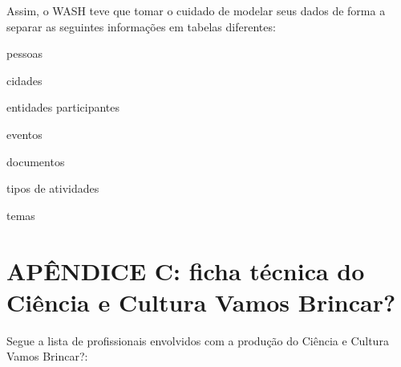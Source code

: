 \documentclass[
12pt,		%
openright,	%
twoside,  %
a4paper,			%
chapter=TITLE,		%
english,			%
french,				%
spanish,			%
brazil				%
]{USPSC-classe/USPSC}
\begin{document}
Assim, o WASH teve que tomar o cuidado de modelar seus dados de forma a separar as seguintes informa\c{c}\~oes em tabelas diferentes:










\begin{alineas}
\item pessoas
\item cidades
\item entidades participantes
\item eventos
\item documentos
\item tipos de atividades
\item temas
\end{alineas}

\chapter[AP\^ENDICE C: ficha t\'ecnica do \textquotedbl Ci\^encia e Cultura Vamos Brincar?\textquotedbl ]{AP\^ENDICE C: ficha t\'ecnica do \textquotedbl Ci\^encia e Cultura Vamos Brincar?\textquotedbl }\label{AP\^ENDICE C: ficha t\'ecnica do \textquotedbl Ci\^encia e Cultura Vamos Brincar?\textquotedbl }
Segue a lista de profissionais envolvidos com a produ\c{c}\~ao do \textquotedbl Ci\^encia e Cultura Vamos Brincar?\textquotedbl :
\end{document}
